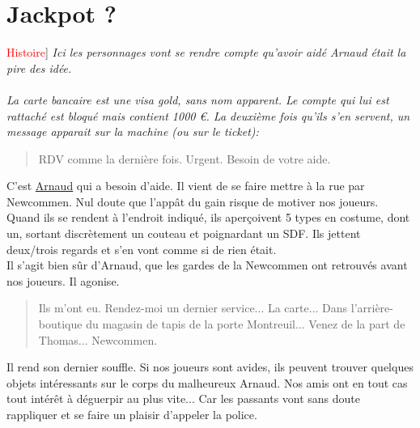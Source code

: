 \documentclass[10pt,a4paper,twocolumn]{article}
\newenvironment{lAbstract}[1]{{[}\textcolor{red}{#1}{]}\itshape}{\\ \\}
\begin{document}
\section{Jackpot ?}
\begin{lAbstract}{Histoire}
Ici les personnages vont se rendre compte qu'avoir aidé Arnaud était la pire des idée.
\end{lAbstract}
La carte bancaire est une visa gold, sans nom apparent. Le compte qui lui est rattaché est bloqué mais contient 1000 €. La deuxième fois qu'ils s'en servent, un message apparait sur la machine (ou sur le ticket): 
\begin{quote}
RDV comme la dernière fois. Urgent. Besoin de votre aide.
\end{quote}
C'est \hyperlink{arnaud}{Arnaud} qui a besoin d'aide. Il vient de se faire mettre à la rue par Newcommen. Nul doute que l'appât du gain risque de motiver nos joueurs. \\
Quand ils se rendent à l'endroit indiqué, ils aperçoivent 5 types en costume, dont un, sortant discrètement un couteau et poignardant un SDF. Ils jettent deux/trois regards et s'en vont comme si de rien était.
\\
Il s'agit bien sûr d'Arnaud, que les gardes de la Newcommen ont retrouvés avant nos joueurs. Il agonise.
\begin{quote}
Ils m'ont eu. Rendez-moi un dernier service... La carte... Dans l'arrière-boutique du magasin de tapis de la porte Montreuil... Venez de la part de Thomas... Newcommen.
\end{quote}
Il rend son dernier souffle.
Si nos joueurs sont avides, ils peuvent trouver quelques objets intéressants sur le corps du malheureux Arnaud.
Nos amis ont en tout cas tout intérêt à déguerpir au plus vite... Car les passants vont sans doute rappliquer et se faire un plaisir d'appeler la police.
\end{document}
